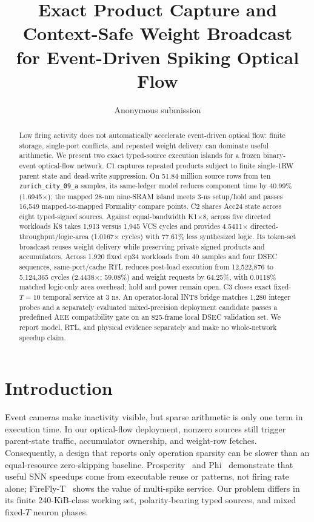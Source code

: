 \documentclass[conference]{IEEEtran}
\title{Exact Product Capture and Context-Safe Weight Broadcast\\
for Event-Driven Spiking Optical Flow}
\author{Anonymous submission}
\begin{document}
\maketitle

\begin{abstract}
Low firing activity does not automatically accelerate event-driven optical
flow: finite storage, single-port conflicts, and repeated weight delivery can
dominate useful arithmetic.  We present two exact typed-source execution
islands for a frozen binary-event optical-flow network.  C1 captures repeated
products subject to finite single-1RW parent state and dead-write suppression.
On 51.84 million source rows from ten \texttt{zurich\_city\_09\_a} samples,
its same-ledger model reduces component time by
40.99\% (1.6945$\times$); the mapped 28-nm nine-SRAM island meets 3-ns
setup/hold and passes 16,549 mapped-to-mapped Formality compare points.  C2 shares Acc24
state across eight typed-signed sources.  Against equal-bandwidth K1$\times$8,
across five directed workloads K8 takes 1,913 versus 1,945 VCS cycles and
provides 4.5411$\times$
directed-throughput/logic-area (1.0167$\times$ cycles) with 77.61\% less
synthesized logic.  Its
token-set broadcast reuses weight delivery while preserving private signed
products and accumulators.  Across 1,920 fixed ep34 workloads from 40 samples
and four DSEC sequences, same-port/cache RTL reduces post-load execution from
12,522,876 to 5,124,365 cycles (2.4438$\times$; 59.08\%) and weight requests by 64.25\%,
with 0.0118\% matched logic-only area overhead; hold and power remain open.  C3
closes exact fixed-$T{=}10$ temporal service at 3 ns.  An operator-local INT8 bridge matches 1,280 integer
probes and a separately evaluated mixed-precision deployment candidate passes
a predefined AEE compatibility gate on an 825-frame local DSEC validation set.
We report model, RTL, and physical evidence separately and make no whole-network speedup claim.
\end{abstract}

\section{Introduction}
Event cameras make inactivity visible, but sparse arithmetic is only one term
in execution time.  In our optical-flow deployment, nonzero sources still
trigger parent-state traffic, accumulator ownership, and weight-row fetches.
Consequently, a design that reports only operation sparsity can be slower than
an equal-resource zero-skipping baseline.  Prosperity~\cite{prosperity} and
Phi~\cite{phi} demonstrate that useful SNN speedups come from executable reuse
or patterns, not firing rate alone; FireFly-T~\cite{fireflyt} shows the value of
multi-spike service.  Our problem differs in its finite 240-KiB-class working
set, polarity-bearing typed sources, and mixed fixed-$T$ neuron phases.
\end{document}
